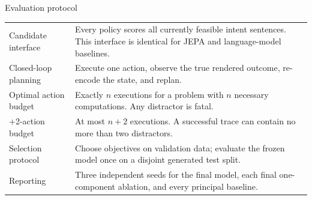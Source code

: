 \documentclass[aspectratio=169,10pt]{beamer}
\begin{document}
\begin{frame}{Evaluation protocol}
\small
\begin{tabular}{p{}p{}}
\toprule
Candidate interface & Every policy scores all currently feasible intent
sentences. This interface is identical for JEPA and language-model baselines.\\
Closed-loop planning & Execute one action, observe the true rendered outcome,
re-encode the state, and replan.\\
Optimal action budget & Exactly $n$ executions for a problem with $n$ necessary
computations. Any distractor is fatal.\\
+2-action budget & At most $n+2$ executions. A successful trace can contain no
more than two distractors.\\
Selection protocol & Choose objectives on validation data; evaluate the
frozen model once on a disjoint generated test split.\\
Reporting & Three independent seeds for the final model, each final
one-component ablation, and every principal baseline.\\
\bottomrule
\end{tabular}
\end{frame}
\end{document}

